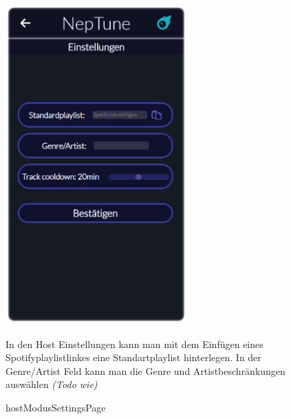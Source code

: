 \documentclass[oneside, ngerman]{sdqtechreport}
\begin{document}
\begin{figure}
    \hypertarget{hostModusSettingsPage}{}
    \begin{minipage}[t]{7 cm}
        \vspace{-1.5ex}
        \includegraphics[width=7cm]{LATEX/Pflichtenheft/GraphicDesigns/hostModusSettingsPage.png}
        \caption{hostModusSettingsPage}
    \end{minipage}
    \hspace{1cm}
    \begin{minipage}[t]{7 cm}
        \vspace{1cm}
        In den Host Einstellungen kann man mit dem Einfügen eines Spotifyplaylistlinkes eine Standartplaylist hinterlegen.
        In der Genre/Artist Feld kann man die Genre und Artistbeschränkungen auswählen \textit{(Todo wie)}
    \end{minipage}
\end{figure}
\end{document}
